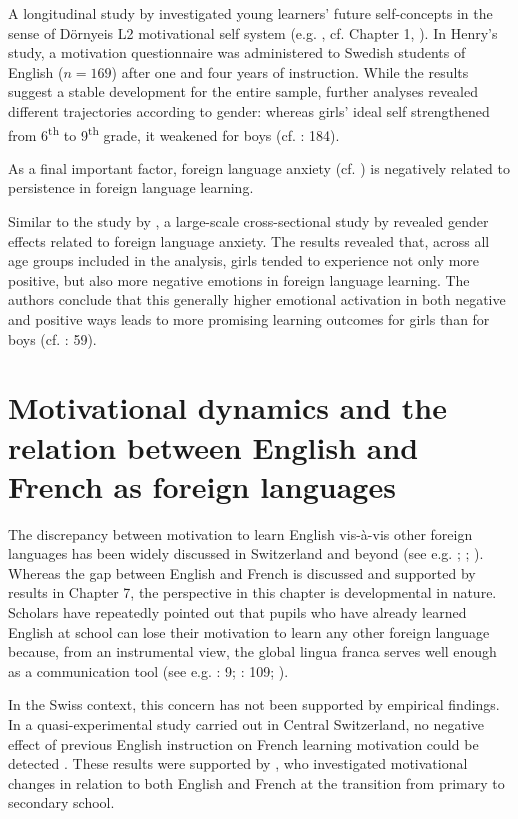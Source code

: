 \documentclass[output=paper]{langsci/langscibook}
\begin{document}
A longitudinal study by \citet{Henry2009} investigated young learners’ future self-concepts in the sense of Dörnyeis L2 motivational self system (e.g. \citealt{Doernyei2009}, cf. Chapter 1, ). In Henry’s study, a motivation questionnaire was administered to Swedish students of English ($n=169$) after one and four years of instruction. While the results suggest a stable development for the entire sample, further analyses revealed different trajectories according to gender: whereas girls’ ideal self strengthened from 6\textsuperscript{th} to 9\textsuperscript{th} grade, it weakened for boys (cf. \citealt{Henry2009}: 184). 

As a final important factor, foreign language anxiety (cf. \citealt{MacIntyre1999}) is negatively related to persistence in foreign language learning.

Similar to the study by \citet{Henry2009}, a large-scale cross-sectional study by \citet{DewaeleEtAl2016} revealed gender effects related to foreign language anxiety. The results revealed that, across all age groups included in the analysis, girls tended to experience not only more positive, but also more negative emotions in foreign language learning. The authors conclude that this generally higher emotional activation in both negative and positive ways leads to more promising learning outcomes for girls than for boys (cf. \citealt{DewaeleEtAl2016}: 59).

\section{Motivational dynamics and the relation between English and French as foreign languages}

The discrepancy between motivation to learn English vis-à-vis other foreign languages has been widely discussed in Switzerland and beyond (see e.g. \citealt{BuylHousen2014}; \citealt{Ushioda2017}; \citealt{Busse2017}). Whereas the gap between English and French is discussed and supported by results in Chapter 7, the perspective in this chapter is developmental in nature. Scholars have repeatedly pointed out that pupils who have already learned English at school can lose their motivation to learn any other foreign language because, from an instrumental view, the global lingua franca serves well enough as a communication tool (see e.g. \citealt{Hufeisen2003}: 9; \citealt{MeissnerEtAl2008}: 109; \citealt{Ushioda2017}).

In the Swiss context, this concern has not been supported by empirical findings. In a quasi-experimental study carried out in Central Switzerland, no negative effect of previous English instruction on French learning motivation could be detected \citep{Heinzmann2010}. These results were supported by \citet[176]{BruehwilerLePapeRacine2017}, who investigated motivational changes in relation to both English and French at the transition from primary to secondary school. 
\end{document}
